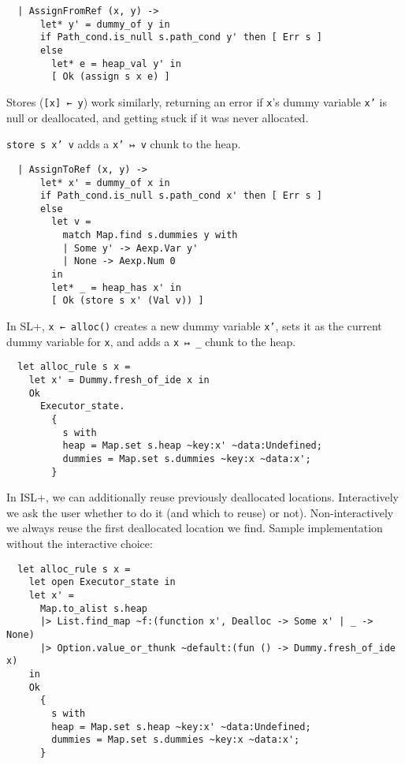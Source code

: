 \documentclass[parskip=half]{scrartcl}
\begin{document}
\begin{verbatim}
  | AssignFromRef (x, y) ->
      let* y' = dummy_of y in
      if Path_cond.is_null s.path_cond y' then [ Err s ]
      else
        let* e = heap_val y' in
        [ Ok (assign s x e) ]
\end{verbatim}


Stores (\texttt{[x] ← y}) work similarly, returning an error if \texttt{x}'s dummy variable \texttt{x'} is null or deallocated, and getting stuck if it was never allocated.

\texttt{store s x' v} adds a \texttt{x' ↦ v} chunk to the heap.

\begin{verbatim}
  | AssignToRef (x, y) ->
      let* x' = dummy_of x in
      if Path_cond.is_null s.path_cond x' then [ Err s ]
      else
        let v =
          match Map.find s.dummies y with
          | Some y' -> Aexp.Var y'
          | None -> Aexp.Num 0
        in
        let* _ = heap_has x' in
        [ Ok (store s x' (Val v)) ]
\end{verbatim}


In SL+, \texttt{x ← alloc()} creates a new dummy variable \texttt{x'}, sets it as the current dummy variable for \texttt{x}, and adds a \texttt{x ↦ \_} chunk to the heap.

\begin{verbatim}
  let alloc_rule s x =
    let x' = Dummy.fresh_of_ide x in
    Ok
      Executor_state.
        {
          s with
          heap = Map.set s.heap ~key:x' ~data:Undefined;
          dummies = Map.set s.dummies ~key:x ~data:x';
        }
\end{verbatim}

In ISL+, we can additionally reuse previously deallocated locations. Interactively we ask the user whether to do it (and which to reuse) or not). Non-interactively we always reuse the first deallocated location we find. Sample implementation without the interactive choice:

\begin{verbatim}
  let alloc_rule s x =
    let open Executor_state in
    let x' =
      Map.to_alist s.heap
      |> List.find_map ~f:(function x', Dealloc -> Some x' | _ -> None)
      |> Option.value_or_thunk ~default:(fun () -> Dummy.fresh_of_ide x)
    in
    Ok
      {
        s with
        heap = Map.set s.heap ~key:x' ~data:Undefined;
        dummies = Map.set s.dummies ~key:x ~data:x';
      }
\end{verbatim}
\end{document}

